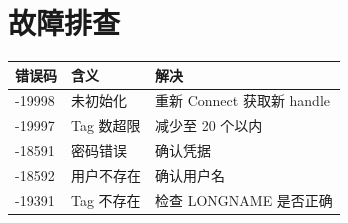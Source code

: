 \documentclass[12pt,a4paper]{ctexart}
\begin{document}
\section{故障排查}

\begin{table}[H]\centering
\begin{tabular}{llp{5cm}}
\toprule
\textbf{错误码} & \textbf{含义} & \textbf{解决} \\
\midrule
-19998 & 未初始化 & 重新 Connect 获取新 handle \\
-19997 & Tag 数超限 & 减少至 20 个以内 \\
-18591 & 密码错误 & 确认凭据 \\
-18592 & 用户不存在 & 确认用户名 \\
-19391 & Tag 不存在 & 检查 LONGNAME 是否正确 \\
\bottomrule
\end{tabular}
\end{table}
\end{document}
